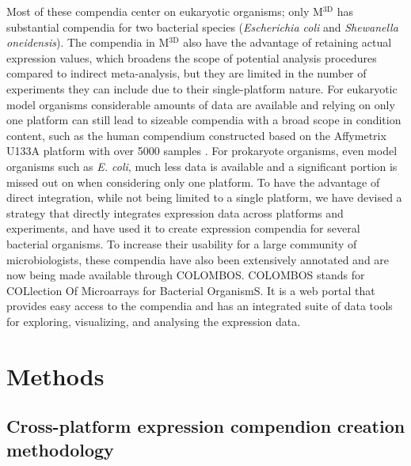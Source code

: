 Most of these compendia center on eukaryotic organisms; only M$^{\textrm{3D}}$ 
has substantial compendia for two bacterial species ({\it Escherichia coli} and 
{\it Shewanella oneidensis}). The compendia in M$^{\textrm{3D}}$ also have the 
advantage of retaining actual expression values, which broadens the scope of 
potential analysis procedures compared to indirect meta-analysis, but they are 
limited in the number of experiments they can include due to their 
single-platform nature. For eukaryotic model organisms considerable amounts of 
data are available and relying on only one platform can still lead to sizeable 
compendia with a broad scope in condition content, such as the human compendium 
constructed based on the Affymetrix U133A platform with over 5000 samples 
\cite{Lukk2010}. For prokaryote organisms, even model organisms such as {\it E. 
coli}, much less data is available and a significant portion is missed out on 
when considering only one platform. To have the advantage of direct 
integration, while not being limited to a single platform, we have devised a 
strategy that directly integrates expression data across platforms and 
experiments, and have used it to create expression compendia for several 
bacterial organisms. To increase their usability for a large community of 
microbiologists, these compendia have also been extensively annotated and are 
now being made available through COLOMBOS. COLOMBOS stands 
for COLlection Of Microarrays for Bacterial OrganismS. It is a web portal that 
provides easy access to the compendia and has an integrated suite of data tools 
for exploring, visualizing, and analysing the expression data.



\section{Methods}


\subsection{Cross-platform expression compendion creation methodology} 
\label{sec:colombos-comp-method}

